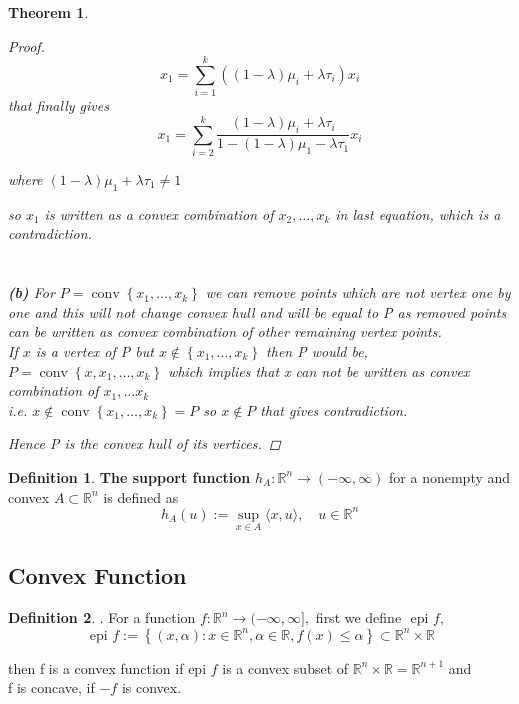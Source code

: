 \documentclass[oneside]{book}
\newtheorem{theorem}{Theorem}[section]
\theoremstyle{definition}
\newtheorem{mydef}{Definition}[chapter]
\begin{document}
\begin{theorem}
\begin{proof}
\begin{equation} 
\label{eq38}
x_{1}=\sum_{i=1}^{k}\left((1-\lambda) \mu_{i}+\lambda \tau_{i}\right) x_{i}
\end{equation}
that finally gives 
\begin{equation} 
\label{eq39}
x_{1}=\sum_{i=2}^{k} \frac{(1-\lambda) \mu_{i}+\lambda \tau_{i}}{1-(1-\lambda) \mu_{1}-\lambda \tau_{1}} x_{i}
\end{equation}

where $(1-\lambda) \mu_{1}+\lambda \tau_{1} \neq 1$ \par
 so $x_{1}$ is written as a convex combination of $x_{2}, \ldots, x_{k}$ in last equation, which is  a contradiction.
\\\\\\
\textbf{(b)}  For $P=\operatorname{conv}\left\{x_{1}, \ldots, x_{k}\right\}$ we can remove points  which are not vertex  
one by one and this will not change convex hull and will be equal to P as removed points can be written as convex combination of other remaining vertex points. \\
If $x$ is a vertex of P but $x \notin \left\{x_{1}, \ldots, x_{k}\right\} $ then P would be,
$P=\operatorname{conv}\left\{x,x_{1}, \ldots, x_{k}\right\}$ 
which implies that x can not be written as convex combination of $x_{1}, \ldots x_{k}$ \\ i.e. 
 $x \notin  \operatorname{conv} \left\{x_{1}, \ldots, x_{k}\right\} = P  $ so $x \notin P$ that gives contradiction.\par
 Hence P is the convex hull of its vertices.
\end{proof}


\end{theorem}


\begin{mydef}
 \textbf{The support function }$h_{A}: \mathbb{R}^{n} \rightarrow(-\infty, \infty) $  for a nonempty and convex $A \subset \mathbb{R}^{n}$ is defined as
$$
h_{A}(u):=\sup _{x \in A}\langle x, u\rangle, \quad u \in \mathbb{R}^{n}
$$

\end{mydef}



\subsection{Convex Function}



\begin{mydef}. 
For a function   $f: \mathbb{R}^{n} \rightarrow(-\infty, \infty],$ first we define $\text { epi } f, $  
\begin{equation}
\label{eq40}
\text { epi } f:=\left\{(x, \alpha): x \in \mathbb{R}^{n}, \alpha \in \mathbb{R}, f(x) \leq \alpha\right\} \subset \mathbb{R}^{n} \times \mathbb{R} 
\end{equation}
\end{mydef}
  then f is a convex function if epi $f$ is a convex subset of $\mathbb{R}^{n} \times \mathbb{R}=\mathbb{R}^{n+1}$  and \\  f is concave, if $-f$ is convex. 
  
\end{document}
